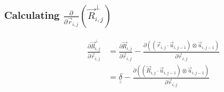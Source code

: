 \documentclass{article}
\renewcommand{\ij}{_{i,j}}
\newcommand{\ijj}{_{i,j-1}}
\renewcommand{\part}[2]{\frac{\partial #1 }{\partial #2}}
\newcommand{\partbig}[2]{\frac{\partial }{\partial #2}\left( #1 \right)}
\newcommand{\ten}[1]{\underline{\underline{#1}}}
\newcommand{\rij}{\vec{r} \ij}
\newcommand{\Rij}{\vec{R} \ij}
\begin{document}
 \subsubsection{Calculating $\displaystyle\partbig{\Rij^\perp}{\rij}$}

\begin{align*}
  \label{eqn:Rperpri}
  \part{\vec{R}\ij ^ \bot}{\vec{r}\ij}  
  &=
  \part{\Rij}{\rij}
  - \part{\left(\left(\vec{r}\ij \cdot \vec{u} \ijj \right) \otimes 
  \vec{u} \ijj \right)
  }{\vec{r}\ij}
  \\
  &=
  \ten{\delta} 
  - \part{\left(\left(\vec{R}\ij \cdot \vec{u} \ijj \right) \otimes 
  \vec{u} \ijj \right)
  }{\vec{r}\ij}
\end{align*}
\end{document}
